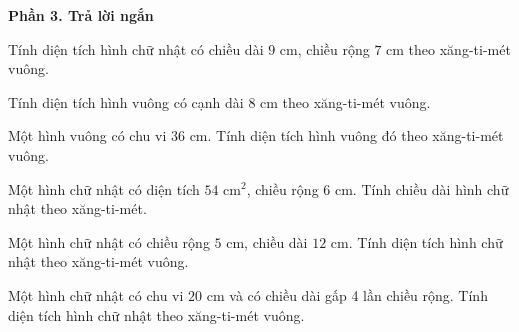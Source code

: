 \textbf{Phần 3. Trả lời ngắn}

\begin{ex} %
Tính diện tích hình chữ nhật có chiều dài $9\text{ cm}$, chiều rộng $7\text{ cm}$ theo xăng-ti-mét vuông.
\end{ex}

\begin{ex} %
Tính diện tích hình vuông có cạnh dài $8\text{ cm}$ theo xăng-ti-mét vuông.
\end{ex}

\begin{ex} %
Một hình vuông có chu vi $36\text{ cm}$. Tính diện tích hình vuông đó theo xăng-ti-mét vuông.
\end{ex}

\begin{ex} %
Một hình chữ nhật có diện tích $54\text{ cm}^2$, chiều rộng $6\text{ cm}$. Tính chiều dài hình chữ nhật theo xăng-ti-mét.
\end{ex}

\begin{ex} %
Một hình chữ nhật có chiều rộng $5\text{ cm}$, chiều dài $12\text{ cm}$. Tính diện tích hình chữ nhật theo xăng-ti-mét vuông.
\end{ex}

\begin{ex} %
Một hình chữ nhật có chu vi $20\text{ cm}$ và có chiều dài gấp 4 lần chiều rộng. Tính diện tích hình chữ nhật theo xăng-ti-mét vuông.
\end{ex}
